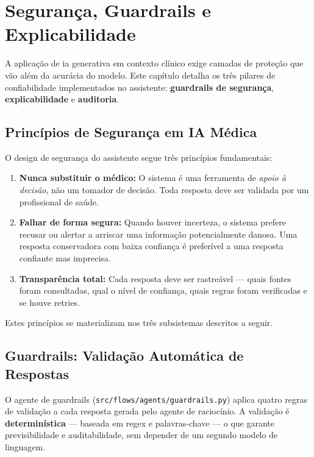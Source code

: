 
\chapter{Segurança, Guardrails e Explicabilidade}\label{cap:seguranca}

A aplicação de \acrshort{ia} generativa em contexto clínico exige camadas de proteção que vão além da acurácia do modelo. Este capítulo detalha os três pilares de confiabilidade implementados no assistente: \textbf{guardrails de segurança}, \textbf{explicabilidade} e \textbf{auditoria}.

\section{Princípios de Segurança em IA Médica}

O design de segurança do assistente segue três princípios fundamentais:

\begin{enumerate}
    \item \textbf{Nunca substituir o médico:} O sistema é uma ferramenta de \emph{apoio à decisão}, não um tomador de decisão. Toda resposta deve ser validada por um profissional de saúde.

    \item \textbf{Falhar de forma segura:} Quando houver incerteza, o sistema prefere recusar ou alertar a arriscar uma informação potencialmente danosa. Uma resposta conservadora com baixa confiança é preferível a uma resposta confiante mas imprecisa.

    \item \textbf{Transparência total:} Cada resposta deve ser rastreável --- quais fontes foram consultadas, qual o nível de confiança, quais regras foram verificadas e se houve retries.
\end{enumerate}

Estes princípios se materializam nos três subsistemas descritos a seguir.

\section{Guardrails: Validação Automática de Respostas}\label{sec:guardrails}

O agente de guardrails (\texttt{src/flows/agents/guardrails.py}) aplica quatro regras de validação a cada resposta gerada pelo agente de raciocínio. A validação é \textbf{determinística} --- baseada em regex e palavras-chave --- o que garante previsibilidade e auditabilidade, sem depender de um segundo modelo de linguagem.

